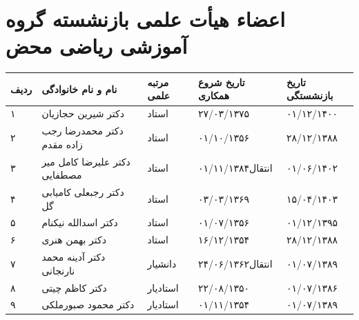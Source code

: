 \documentclass[
  letterpaper,
  DIV=11,
  numbers=noendperiod]{scrreprt}
\newcounter{none} %
\begin{document}
\section{اعضاء هیأت علمی بازنشسته گروه آموزشی ریاضی
محض}\label{ux627ux639ux636ux627ux621-ux647ux6ccux623ux62a-ux639ux644ux645ux6cc-ux628ux627ux632ux646ux634ux633ux62aux647-ux6afux631ux648ux647-ux622ux645ux648ux632ux634ux6cc-ux631ux6ccux627ux636ux6cc-ux645ux62dux636}

{\def\LTcaptype{none} %
\begin{longtable}[]{@{}
  >{\raggedright\arraybackslash}p{}
  >{\raggedright\arraybackslash}p{}
  >{\raggedright\arraybackslash}p{}
  >{\raggedright\arraybackslash}p{}
  >{\raggedright\arraybackslash}p{}@{}}
\toprule\noalign{}
\begin{minipage}[b]{\linewidth}\raggedright
ردیف
\end{minipage} & \begin{minipage}[b]{\linewidth}\raggedright
نام و نام خانوادگی
\end{minipage} & \begin{minipage}[b]{\linewidth}\raggedright
مرتبه علمی
\end{minipage} & \begin{minipage}[b]{\linewidth}\raggedright
تاریخ شروع همکاری
\end{minipage} & \begin{minipage}[b]{\linewidth}\raggedright
تاریخ بازنشستگی
\end{minipage} \\
\midrule\noalign{}
\endhead
\bottomrule\noalign{}
\endlastfoot
۱ & دکتر شیرین حجازیان & استاد & ۲۷/۰۳/۱۳۷۵ & ۰۱/۱۲/۱۴۰۰ \\
۲ & دکتر محمدرضا رجب زاده مقدم & استاد & ۰۱/۱۰/۱۳۵۶ & ۲۸/۱۲/۱۳۸۸ \\
۳ & دکتر علیرضا کامل میر مصطفایی & استاد & انتقال۰۱/۱۱/۱۳۸۴ &
۰۱/۰۶/۱۴۰۲ \\
۴ & دکتر رجبعلی کامیابی گل & استاد & ۰۳/۰۳/۱۳۶۹ & ۱۵/۰۴/۱۴۰۳ \\
۵ & دکتر اسدالله نیکنام & استاد & ۰۱/۰۷/۱۳۵۶ & ۰۱/۱۲/۱۳۹۵ \\
۶ & دکتر بهمن هنری & استاد & ۱۶/۱۲/۱۳۵۴ & ۲۸/۱۲/۱۳۸۸ \\
۷ & دکتر آدینه محمد نارنجانی & دانشیار & انتقال۲۴/۰۶/۱۳۶۲ &
۰۱/۰۷/۱۳۸۹ \\
۸ & دکتر کاظم چیتی & استادیار & ۲۲/۰۸/۱۳۵۰ & ۰۱/۰۷/۱۳۸۶ \\
۹ & دکتر محمود صبورملکی & استادیار & ۰۱/۱۱/۱۳۵۴ & ۰۱/۰۷/۱۳۸۹ \\
\end{longtable}
}
\end{document}
